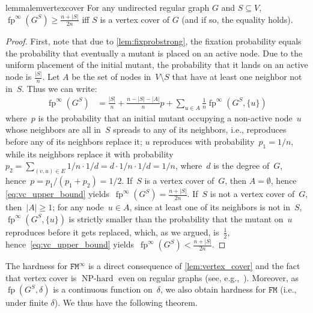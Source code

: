 \documentclass[letterpaper]{article}
\newcommand{\fp}{\operatorname{fp}}
\newcommand{\NodeActivationMoran}{\texttt{FM}}
\newcommand{\NodeActivationMoranStrong}{\texttt{FM}^{\infty}}
\newcommand{\FitAdv}{\delta}
\newcommand{\NPH}{\operatorname{NP-hard}}
\begin{document}
\begin{restatable}{lemma}{lemvertexcover}\label{lem:vertex_cover}
For any undirected regular graph $G$ and $S\subseteq V$, $\fp^{\infty}(G^{S})\geq\frac{n+|S|}{2n}$ iff $S$ is a vertex cover of $G$ (and if so, the equality holds).
\end{restatable}

\begin{proof} 
First, note that due to \cref{lem:fixprobstrong}, the fixation probability equals the probability that eventually a mutant is placed on an active node. Due to the uniform placement of the initial mutant, the probability that it lands on an active node is $\frac{|S|}{n}$. 
Let $A$ be the set of nodes in~$V\setminus S$ that have at least one neighbor not in~$S$.
Thus we can write:
\begin{align}
\fp^{\infty}(G^{S}) &= {\textstyle \frac{|S|}{n} \!+\! \frac{n-|S|-|A|}{n}p} \!+\! \sum_{u\in A}{\textstyle \frac{1}{n}} \fp^{\infty}(G^S\!, \{u\})
\label{eq:vc_upper_bound}
\end{align}
where~$p$ is the probability that an initial mutant occupying a non-active node~$u$ whose neighbors are all in~$S$ spreads to any of its neighbors, i.e., reproduces before any of its neighbors replace it; $u$ reproduces with probability~$p_1 = 1/n$, while its neighbors replace it with probability $p_2 = \sum_{(v,u)\in E} 1/n\cdot 1/d = d \cdot 1/n\cdot 1/d = 1/n$, where~$d$ is the degree of~$G$, hence~$p = p_1/(p_1+p_2) = 1/2$. 
If~$S$ is a vertex cover of~$G$, then $A = \emptyset$, hence \cref{eq:vc_upper_bound} yields~$\fp^{\infty}(G^{S}) = \frac{n+|S|}{2n}$.
If~$S$ is not a vertex cover of~$G$, then~$|A|\geq 1$; for any node~$u \in A$, since at least one of its neighbors is not in~$S$, $\fp^{\infty}(G^S, \{u\})$ is strictly smaller than the probability that the mutant on~$u$ reproduces before it gets replaced, which, as we argued, is~$\frac{1}{2}$, hence~\cref{eq:vc_upper_bound} yields~$\fp^{\infty}(G^{S})<\frac{n+|S|}{2n}$. %
\end{proof}

The hardness for $\NodeActivationMoranStrong$  is a direct consequence of \cref{lem:vertex_cover} and the fact that vertex cover is $\NPH$ even on regular graphs (see, e.g.,~\cite{Feige2003}). Moreover, as $\fp(G^S, \FitAdv)$ is a continuous function on~$\FitAdv$, we also obtain hardness for $\NodeActivationMoran$ (i.e., under finite $\FitAdv$).
We thus have the following theorem.
\end{document}
